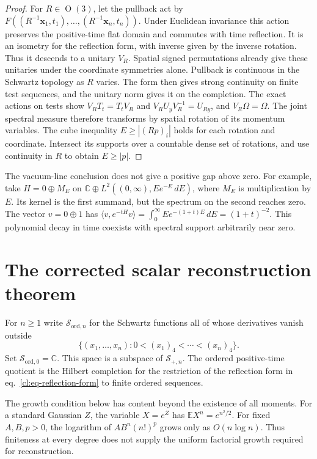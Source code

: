 \documentclass[11pt,letterpaper,reqno]{amsart}
\numberwithin{equation}{section}
\renewcommand{\eqref}[1]{\textup{eq.~\ref{#1}}}
\theoremstyle{definition}
\theoremstyle{remark}
\begin{document}
\begin{proof}
For \(R\in\operatorname{O}(3)\), let the pullback act by
\(F((R^{-1}\mathbf x_1,t_1),\ldots,(R^{-1}\mathbf x_n,t_n))\).
Under Euclidean invariance this action preserves the positive-time
flat domain and commutes with time reflection. It is an
isometry for the reflection form, with inverse given by
the inverse rotation. Thus it descends to a unitary
\(V_R\). Spatial signed permutations already give these
unitaries under the coordinate symmetries alone. Pullback is continuous in the Schwartz topology
as \(R\) varies. The form then gives strong continuity on
finite test sequences, and the unitary norm gives it on
the completion. The exact actions on tests show
\(V_RT_t=T_tV_R\) and \(V_RU_yV_R^{-1}=U_{Ry}\), and
\(V_R\Omega=\Omega\). The joint spectral measure therefore
transforms by spatial rotation of its momentum variables.
The cube inequality \(E\ge |(Rp)_i|\) holds for each
rotation and coordinate. Intersect its supports over a
countable dense set of rotations, and use continuity in
\(R\) to obtain \(E\ge|p|\).
\end{proof}


The vacuum-line conclusion does not give a positive gap above
zero. For example, take \(H=0\oplus M_E\) on
\(\mathbb C\oplus L^2((0,\infty),Ee^{-E}\,dE)\), where
\(M_E\) is multiplication by \(E\). Its kernel is the first
summand, but the spectrum on the second reaches zero. The
vector \(v=0\oplus1\) has
\(\langle v,e^{-tH}v\rangle=\int_0^\infty Ee^{-(1+t)E}\,dE
=(1+t)^{-2}\). This polynomial decay in time coexists with
spectral support arbitrarily near zero.

\section{The corrected scalar reconstruction theorem}
\label{cl:sec-reconstruction}

For \(n\ge1\) write \(\mathcal S_{\mathrm{ord},n}\) for the
Schwartz functions all of whose derivatives vanish outside
\[
 \{(x_1,\ldots,x_n):0<(x_1)_4<\cdots<(x_n)_4\}.
\]
Set \(\mathcal S_{\mathrm{ord},0}=\mathbb C\). This space
is a subspace of \(\mathcal S_{+,n}\). The ordered
positive-time quotient is the Hilbert completion for the
restriction of the reflection form in
\eqref{cl:eq-reflection-form} to finite ordered sequences.

The growth condition below has content beyond the existence
of all moments. For a standard Gaussian \(Z\), the variable
\(X=e^Z\) has \(\mathbb E X^n=e^{n^2/2}\). For fixed
\(A,B,p>0\), the logarithm of \(AB^n(n!)^p\) grows only as
\(O(n\log n)\). Thus finiteness at every degree does not
supply the uniform factorial growth required for reconstruction.
\end{document}
